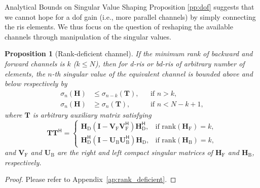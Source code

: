 \documentclass[journal]{IEEEtran}
\newtheorem{proposition}{Proposition}
\begin{document}
\begin{section}{Analytical Bounds on Singular Value Shaping}
		Proposition \ref{pp:dof} suggests that we cannot hope for a \gls{dof} gain (i.e., more parallel channels) by simply connecting the \gls{ris} elements.
		We thus focus on the question of reshaping the available channels through manipulation of the singular values.


		\begin{proposition}[Rank-deficient channel]\label{pp:rank_deficient}
			If the minimum rank of backward and forward channels is $k$ ($k \le N$),
			then for \gls{d}-\gls{ris} or \gls{bd}-\gls{ris} of arbitrary number of elements, the $n$-th singular value of the equivalent channel is bounded above and below respectively by
			\begin{subequations}
				\begin{align}
					\sigma_n(\mathbf{H}) & \le \sigma_{n-k}(\mathbf{T}), &  & \text{if } n > k, \label{iq:sv_bound_enlarge}          \\
					\sigma_n(\mathbf{H}) & \ge \sigma_n(\mathbf{T}),     &  & \text{if } n < N - k + 1, \label{iq:sv_bound_suppress}
				\end{align}
				\label{iq:sv_bound_rank_deficient}
			\end{subequations}
			where $\mathbf{T}$ is arbitrary auxiliary matrix satisfying
			\begin{equation}
				\mathbf{T} \mathbf{T}^\mathsf{H} =
				\begin{cases}
					\mathbf{H}_\mathrm{D} (\mathbf{I} - \mathbf{V}_\mathrm{F} \mathbf{V}_\mathrm{F}^\mathsf{H}) \mathbf{H}_\mathrm{D}^\mathsf{H}, & \text{if } \mathrm{rank}(\mathbf{H}_\mathrm{F}) = k, \\
					\mathbf{H}_\mathrm{D}^\mathsf{H} (\mathbf{I} - \mathbf{U}_\mathrm{B} \mathbf{U}_\mathrm{B}^\mathsf{H}) \mathbf{H}_\mathrm{D}, & \text{if } \mathrm{rank}(\mathbf{H}_\mathrm{B}) = k,
				\end{cases}
				\label{eq:auxiliary_matrix}
			\end{equation}
			and $\mathbf{V}_\mathrm{F}$ and $\mathbf{U}_\mathrm{B}$ are the right and left compact singular matrices of $\mathbf{H}_\mathrm{F}$ and $\mathbf{H}_\mathrm{B}$, respectively.
		\end{proposition}
		\begin{proof}
			Please refer to Appendix~\ref{ap:rank_deficient}.
		\end{proof}


\end{section}
\end{document}
